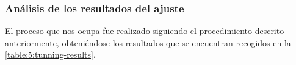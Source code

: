 \subsubsection{Análisis de los resultados del ajuste}

El proceso que nos ocupa fue realizado siguiendo el procedimiento descrito anteriormente, obteniéndose los resultados que se encuentran recogidos en la \autoref{table:5:tunning-results}.

\begin{table}[h]
	\centering
	\caption{Resultados del ajuste paramétrico. Por limites espaciales, se han empleado los números identificativos asignados en la sección anterior.}
	\label{table:5:tunning-results}
\end{table}
